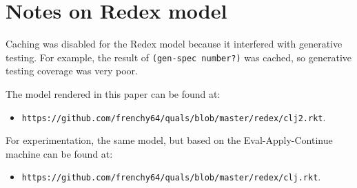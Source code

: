 \section{Notes on Redex model}

Caching was disabled for the Redex model because it interfered with generative testing.
For example, the result of \texttt{(gen-spec number?)} was cached, so generative testing coverage
was very poor.

The model rendered in this paper can be found at:
\begin{itemize}
\item \texttt{https://github.com/frenchy64/quals/blob/master/redex/clj2.rkt}.
\end{itemize}

For experimentation, the same model, but based on the Eval-Apply-Continue machine
can be found at:
\begin{itemize}
\item
 \texttt{https://github.com/frenchy64/quals/blob/master/redex/clj.rkt}.
\end{itemize}

